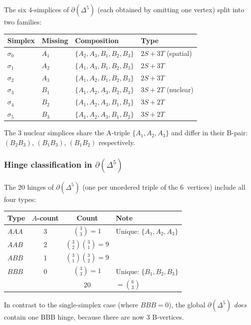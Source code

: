 \documentclass[12pt]{article}
\theoremstyle{remark}
\theoremstyle{definition}
\begin{document}
The six 4-simplices of $\partial(\Delta^5)$ (each obtained by omitting one vertex) split into two families:

\begin{center}
\begin{tabular}{llll}
\toprule
Simplex & Missing & Composition & Type \\
\midrule
$\sigma_0$ & $A_1$ & $\{A_2,A_3,B_1,B_2,B_3\}$ & $2S{+}3T$ (spatial) \\
$\sigma_1$ & $A_2$ & $\{A_1,A_3,B_1,B_2,B_3\}$ & $2S{+}3T$ \\
$\sigma_2$ & $A_3$ & $\{A_1,A_2,B_1,B_2,B_3\}$ & $2S{+}3T$ \\
$\sigma_3$ & $B_1$ & $\{A_1,A_2,A_3,B_2,B_3\}$ & $3S{+}2T$ (nuclear) \\
$\sigma_4$ & $B_2$ & $\{A_1,A_2,A_3,B_1,B_3\}$ & $3S{+}2T$ \\
$\sigma_5$ & $B_3$ & $\{A_1,A_2,A_3,B_1,B_2\}$ & $3S{+}2T$ \\
\bottomrule
\end{tabular}
\end{center}

\noindent
The 3 nuclear simplices share the A-triple $\{A_1, A_2, A_3\}$ and differ in their B-pair: $(B_2 B_3)$, $(B_1 B_3)$, $(B_1 B_2)$ respectively.

\subsubsection{Hinge classification in $\partial(\Delta^5)$}

The 20 hinges of $\partial(\Delta^5)$ (one per unordered triple of the 6~vertices) include all four types:

\begin{center}
\begin{tabular}{lccl}
\toprule
Type & $A$-count & Count & Note \\
\midrule
$AAA$ & 3 & $\binom{3}{3} = 1$ & Unique: $\{A_1, A_2, A_3\}$ \\
$AAB$ & 2 & $\binom{3}{2}\binom{3}{1} = 9$ & \\
$ABB$ & 1 & $\binom{3}{1}\binom{3}{2} = 9$ & \\
$BBB$ & 0 & $\binom{3}{3} = 1$ & Unique: $\{B_1, B_2, B_3\}$ \\
\midrule
& & 20 & $= \binom{6}{3}$ \\
\bottomrule
\end{tabular}
\end{center}

\noindent
In contrast to the single-simplex case (where $BBB = 0$), the global $\partial(\Delta^5)$ \emph{does} contain one BBB hinge, because there are now 3 B-vertices.
\end{document}
